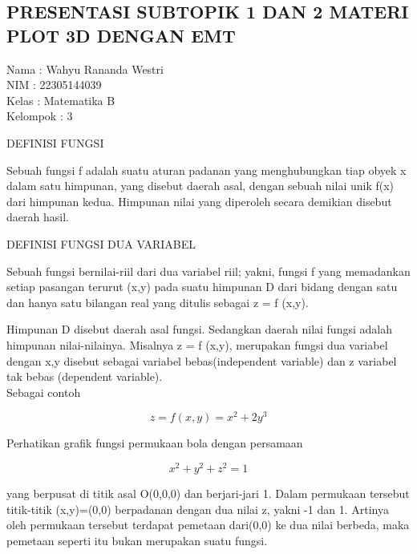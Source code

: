 \documentclass[12pt,arial,letterpaper]{book}
\begin{document}
\begin{eulercomment}
\begin{eulercomment}
\begin{eulercomment}
\begin{eulercomment}
\begin{eulercomment}
\begin{eulercomment}
\begin{eulercomment}
\begin{eulercomment}
\begin{eulercomment}
\begin{eulercomment}
\begin{eulercomment}
\begin{eulercomment}
\begin{eulercomment}
\begin{eulercomment}
\begin{eulercomment}
\begin{eulercomment}
\chapter{PRESENTASI SUBTOPIK 1 DAN 2 MATERI PLOT 3D DENGAN EMT}
\begin{eulercomment}
Nama     : Wahyu Rananda Westri\\
NIM      : 22305144039\\
Kelas    : Matematika B\\
Kelompok : 3

\begin{eulercomment}
\begin{eulercomment}
DEFINISI FUNGSI

Sebuah fungsi f adalah suatu aturan padanan yang menghubungkan tiap
obyek x dalam satu himpunan, yang disebut daerah asal, dengan sebuah
nilai unik f(x) dari himpunan kedua.  Himpunan nilai yang diperoleh
secara demikian disebut daerah hasil.

DEFINISI FUNGSI DUA VARIABEL

Sebuah fungsi bernilai-riil dari dua variabel riil; yakni, fungsi f
yang memadankan setiap pasangan terurut (x,y) pada suatu himpunan D
dari bidang dengan satu dan hanya satu bilangan real yang ditulis
sebagai z = f (x,y).

Himpunan D disebut daerah asal fungsi. Sedangkan daerah nilai fungsi
adalah himpunan nilai-nilainya. Misalnya z = f (x,y), merupakan fungsi
dua variabel dengan x,y disebut sebagai variabel bebas(independent
variable) dan z variabel tak bebas (dependent variable).\\
Sebagai contoh\\
\end{eulercomment}
\begin{eulerformula}
\[
z=f(x,y)=x^2+2y^3
\]
\end{eulerformula}
\begin{eulercomment}
Perhatikan grafik fungsi permukaan bola dengan persamaan\\
\end{eulercomment}
\begin{eulerformula}
\[
x^2+y^2+z^2=1
\]
\end{eulerformula}
\begin{eulercomment}
yang berpusat di titik asal O(0,0,0) dan berjari-jari 1. Dalam
permukaan tersebut titik-titik (x,y)=(0,0) berpadanan dengan dua nilai
z, yakni -1 dan 1.  Artinya oleh permukaan tersebut terdapat pemetaan
dari(0,0) ke dua nilai berbeda, maka pemetaan seperti itu bukan
merupakan suatu fungsi.


\end{eulercomment}
\end{eulercomment}
\end{eulercomment}
\end{eulercomment}
\end{eulercomment}
\end{eulercomment}
\end{eulercomment}
\end{eulercomment}
\end{eulercomment}
\end{eulercomment}
\end{eulercomment}
\end{eulercomment}
\end{eulercomment}
\end{eulercomment}
\end{eulercomment}
\end{eulercomment}
\end{eulercomment}
\end{eulercomment}
\end{eulercomment}
\end{document}
